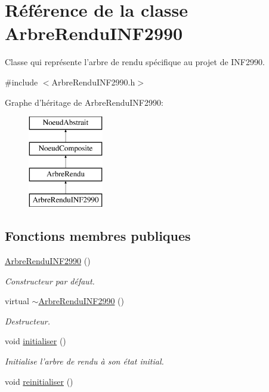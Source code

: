 \hypertarget{class_arbre_rendu_i_n_f2990}{\section{Référence de la classe Arbre\-Rendu\-I\-N\-F2990}
\label{class_arbre_rendu_i_n_f2990}
}


Classe qui représente l'arbre de rendu spécifique au projet de I\-N\-F2990.  




{\ttfamily \#include $<$Arbre\-Rendu\-I\-N\-F2990.\-h$>$}

Graphe d'héritage de Arbre\-Rendu\-I\-N\-F2990\-:\begin{figure}[H]
\begin{center}
\leavevmode
\includegraphics[height=4.000000cm]{class_arbre_rendu_i_n_f2990}
\end{center}
\end{figure}
\subsection*{Fonctions membres publiques}
\begin{DoxyCompactItemize}
\item 
\hyperlink{group__inf2990_ga67528b7fa54e8ef8f96ef2e0bad06d2d}{Arbre\-Rendu\-I\-N\-F2990} ()
\begin{DoxyCompactList}\small\item\em Constructeur par défaut. \end{DoxyCompactList}\item 
virtual \hyperlink{group__inf2990_gaa67526b2fd719f6bcef7a4547bd25c7b}{$\sim$\-Arbre\-Rendu\-I\-N\-F2990} ()
\begin{DoxyCompactList}\small\item\em Destructeur. \end{DoxyCompactList}\item 
void \hyperlink{group__inf2990_ga678d89e1f12ae16ee7dcf6de3db637a3}{initialiser} ()
\begin{DoxyCompactList}\small\item\em Initialise l'arbre de rendu à son état initial. \end{DoxyCompactList}\item 
void \hyperlink{group__inf2990_ga89a0f10b03fe16d6ddc0e8c23ae69e76}{reinitialiser} ()
\end{DoxyCompactItemize}
